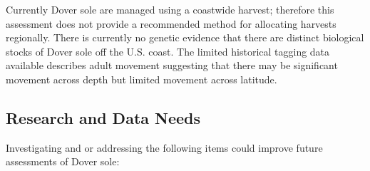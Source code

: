 \documentclass[11pt,
  english,
  a4paper,
]{article}
\begin{document}

Currently Dover sole are managed using a coastwide harvest; therefore this assessment does not provide a recommended method for allocating harvests regionally. There is currently no genetic evidence that there are distinct biological stocks of Dover sole off the U.S. coast. The limited historical tagging data available describes adult movement suggesting that there may be significant movement across depth but limited movement across latitude.

\leavevmode\tagmcend\tagstructend\par


\hypertarget{research-and-data-needs-1}{%
\subsection{Research and Data Needs}\label{research-and-data-needs-1}}

\leavevmode\tagmcend\tagstructend


Investigating and or addressing the following items could improve future assessments of Dover sole:

\leavevmode\tagmcend\tagstructend\par
\end{document}
